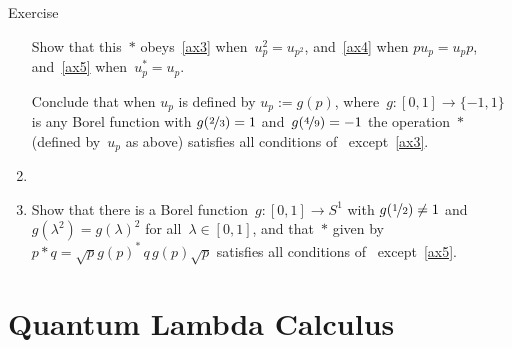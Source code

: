 \documentclass[a]{subfiles}
\begin{document}
\begin{parsec}
\begin{point}{Exercise}
\begin{enumerate}
Show that this~$\ast$ obeys~\ref{ax3} when~$u_p^2=u_{p^2}$,
and~\ref{ax4} when $pu_p=u_p p$,
and~\ref{ax5} when~$u_p^*=u_p$.

Conclude that when $u_p$ is defined by $u_p:=g(p)$,
where~$g\colon [0,1]\to\{-1,1\}$
is any Borel function with $g(\nicefrac{2}{3})=1$
and~$g(\nicefrac{4}{9})=-1$
the operation~$\ast$ (defined by~$u_p$ as above) satisfies
all conditions of~ except~\ref{ax3}.
\item
{}
\item
Show that there is a Borel
function~$g\colon[0,1]\to S^1$
with $g(\nicefrac{1}{2})\neq 1$
and~$g(\lambda^2)=g(\lambda)^2$ for all~$\lambda\in [0,1]$,
and that~$\ast$ given by~$p\ast q = \sqrt{p} g(p)^* \,q \,g(p)\sqrt{p}$
satisfies all conditions of~
except~\ref{ax5}.




\end{enumerate}
\end{point}
\end{parsec}


\section{Quantum Lambda Calculus}
\end{document}
